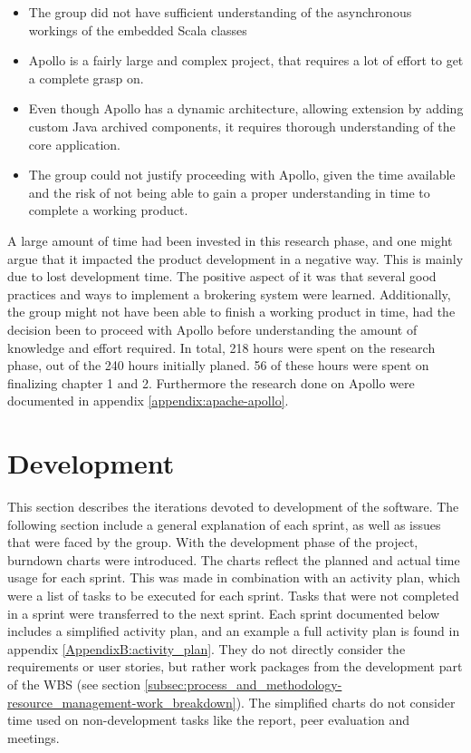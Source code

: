 \begin{itemize}
\item The group did not have sufficient understanding of the asynchronous workings of the embedded Scala classes
\item Apollo is a fairly large and complex project, that requires a lot of effort to get a complete grasp on.
\item Even though Apollo has a dynamic architecture, allowing extension by adding custom Java archived components, it requires thorough understanding of the core application.
\item The group could not justify proceeding with Apollo, given the time available and the risk of not being able to gain a proper understanding in time to complete a working product.
\end{itemize}

A large amount of time had been invested in this research phase, and one might argue that it impacted the product development in a negative way. This is mainly due to lost development time. The positive aspect of it was that several good practices and ways to implement a brokering system were learned. Additionally, the group might not have been able to finish a working product in time, had the decision been to proceed with Apollo before understanding the amount of knowledge and effort required. In total, 218 hours were spent on the research phase, out of the 240 hours initially planed. 56 of these hours were spent on finalizing chapter 1 and 2. Furthermore the research done on Apollo were documented in appendix \ref{appendix:apache-apollo}.  

\section{Development}
\label{subsec:project_lifecycle-development}

This section describes the iterations devoted to development of the software. The following section include a general explanation of each sprint, as well as issues that were faced by the group. With the development phase of the project, burndown charts were introduced. The charts reflect the planned and actual time usage for each sprint. This was made in combination with an activity plan, which were a list of tasks to be executed for each sprint. Tasks that were not completed in a sprint were transferred to the next sprint. Each sprint documented below includes a simplified activity plan, and an example a full activity plan is found in appendix \ref{AppendixB:activity_plan}. They do not directly consider the requirements or user stories, but rather work packages from the development part of the WBS (see section \ref{subsec:process_and_methodology-resource_management-work_breakdown}).  The simplified charts do not consider time used on non-development tasks like the report, peer evaluation and meetings.

